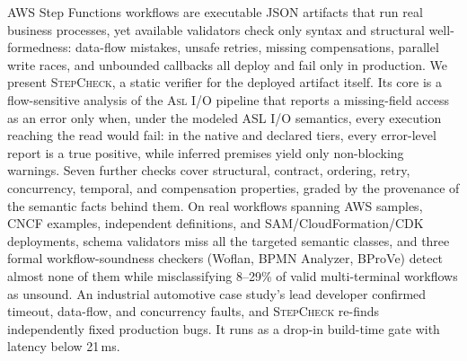 AWS Step Functions workflows are executable JSON artifacts that run
real business processes, yet available validators check only syntax
and structural well-formedness: data-flow mistakes, unsafe retries,
missing compensations, parallel write races, and unbounded callbacks
all deploy and fail only in production. We present \textsc{StepCheck},
a static verifier for the deployed artifact itself. Its core is a
flow-sensitive analysis of the \textsc{Asl} I/O pipeline that reports
a missing-field access as an error only when, under the modeled ASL I/O semantics, every execution reaching
the read would fail: in the native and declared tiers, every
error-level report is a true positive,
while inferred premises yield only non-blocking warnings. Seven
further checks cover structural, contract, ordering, retry,
concurrency, temporal, and compensation properties, graded by the
provenance of the semantic facts behind them. On real workflows
spanning AWS samples, CNCF examples, independent definitions, and
SAM/CloudFormation/CDK deployments, schema validators miss all the
targeted semantic classes, and three formal workflow-soundness
checkers (Woflan, BPMN Analyzer, BProVe) detect almost none of them
while misclassifying 8--29\% of valid multi-terminal workflows as
unsound. An industrial automotive case study's lead developer
confirmed timeout, data-flow, and concurrency faults, and
\textsc{StepCheck} re-finds independently fixed production bugs. It
runs as a drop-in build-time gate with latency below 21\,ms.






